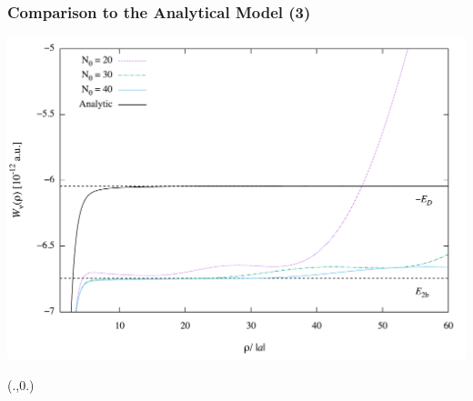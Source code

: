\documentclass[hideothersubsections]{beamer}
\begin{document}
\begin{frame}
\frametitle{Comparison to the Analytical Model (3)}
\centering
\includegraphics[width=1.0\linewidth]{twobodyenergy.pdf}
\begin{textblock*}{9cm}(.\textwidth,0.\textheight)%
	\hyperlink{faddeev}{}
	\hyperlink{neg2}{}
	\hyperlink{pos1}{}         
\end{textblock*}
\end{frame}
\end{document}
